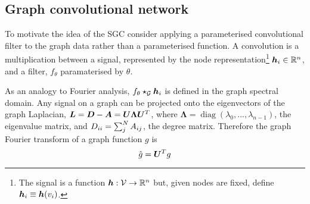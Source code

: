 





\subsection{Graph convolutional network}
\label{sec:GCN}



To motivate the idea of the SGC consider applying a parameterised convolutional filter to the graph data rather than a parameterised function. A convolution is a multiplication between a signal, represented by the node representation\footnote{The signal is a function ${\bm{h}}: {\mathcal{V}} \to \mathbb{R}^n$ but, given nodes are fixed, define ${\bm{h}}_i \equiv {\bm{h}}(v_i)$.}
${\bm{h}}_i \in \mathbb{R}^n$, and a filter, $f_\theta$ paramaterised by $\theta$.

As an analogy to Fourier analysis, $f_\theta \star_{\mathcal{G}} {\bm{h}}_i$ is defined in the graph spectral domain.
Any signal on a graph can be projected onto the eigenvectors of the graph Laplacian, ${\bm{L}} = {\bm{D}} - {\bm{A}} = {\bm{U}}\bm{\Lambda}{\bm{U}}^T$, where $\bm{\Lambda} = \operatorname{diag}(\lambda_0, ..., \lambda_{n-1})$, the eigenvalue matrix, and ${D}_{ii} = \sum_j^N {A}_{ij}$, the degree matrix.
Therefore the graph Fourier transform of a graph function $g$ is
\begin{equation}
    \hat{g} = {\bm{U}}^Tg
\end{equation}

%

